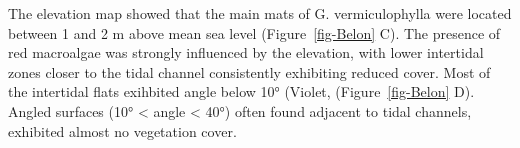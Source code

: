 \documentclass[
  letterpaper,
  11pt,
  english,
  singlespacing,
  headsepline]{MastersDoctoralThesis}
\begin{document}
\begin{spacing}{1.5}
The elevation map showed that the main mats of G. vermiculophylla were
located between 1 and 2 m above mean sea level (Figure~\ref{fig-Belon}
C). The presence of red macroalgae was strongly influenced by the
elevation, with lower intertidal zones closer to the tidal channel
consistently exhibiting reduced cover. Most of the intertidal flats
exihbited angle below 10° (Violet, (Figure~\ref{fig-Belon} D). Angled
surfaces (10° \textless{} angle \textless{} 40°) often found adjacent to
tidal channels, exhibited almost no vegetation cover.

\begin{figure}



\end{figure}
\end{spacing}
\end{document}
